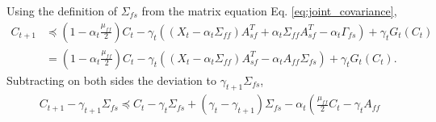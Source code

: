 Using the definition of $\Sigma_{fs}$ from the matrix equation Eq. \eqref{eq:joint_covariance}, 
\begin{align*}
    C_{t+1} &\preceq 
    \left(1 - \alpha_t \frac{\mu_{ff}}{2} \right) C_t 
     - \gamma_t \left( (X_t - \alpha_t \Sigma_{ff}) A_{sf}^T + \alpha_t \Sigma_{ff} A_{sf}^T - \alpha_t \Gamma_{fs}\right)
    + \gamma_t G_t (C_t)    
    \\ & 
    =
    \left(1 - \alpha_t \frac{\mu_{ff}}{2} \right) C_t 
     - \gamma_t \left( (X_t - \alpha_t \Sigma_{ff}) A_{sf}^T - \alpha_t A_{ff} \Sigma_{fs} \right)
    + \gamma_t G_t (C_t)    .
\end{align*}
Subtracting on both sides the deviation to $\gamma_{t+1} \Sigma_{fs}$, 
\begin{align*}
    C_{t+1} - \gamma_{t+1} \Sigma_{fs}
    \preceq 
    C_t - \gamma_t \Sigma_{fs} 
    + (\gamma_t - \gamma_{t+1}) \Sigma_{fs} 
    - \alpha_t \left( \frac{\mu_{ff}}{2} C_t - \gamma_t A_{ff}
\end{align*}

